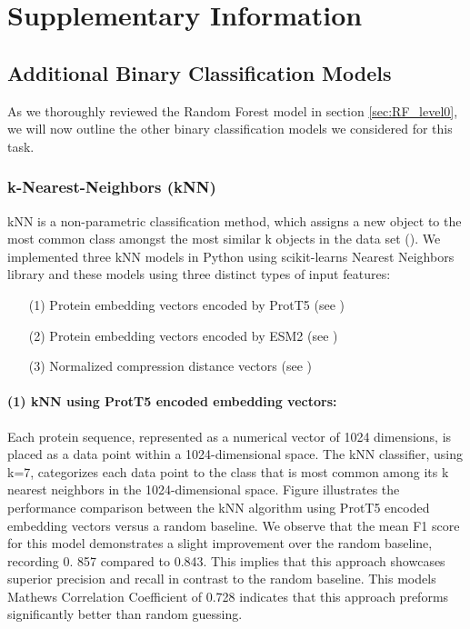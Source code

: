\documentclass{bioinfo}
\begin{document}
\section{Supplementary Information}

\subsection{Additional Binary Classification Models}\label{sec:unused binarys}
As we thoroughly reviewed the Random Forest model in section \ref{sec:RF_level0}, we will now outline the other binary classification models we considered for this task.

\subsubsection{k-Nearest-Neighbors (kNN)}
kNN is a non-parametric classification method,
which assigns a new object to the most common class amongst the most similar k objects in the data set (\cite{knn_principles}). We implemented three kNN models in Python using scikit-learns Nearest Neighbors library and 
these models using three distinct types of input features:
\begin{enumerate}
	\item[(1)] Protein embedding vectors encoded by ProtT5 (see \cite{ProtT5})
    \item[(2)] Protein embedding vectors encoded by ESM2 (see \cite{ESM2})
    \item[(3)] Normalized compression distance vectors (see \cite{GzipTextClassification})
\end{enumerate}


\paragraph{(1) kNN using ProtT5 encoded embedding vectors:}

Each protein sequence, represented as a numerical vector of 1024 dimensions, is placed as a data 
point within a 1024-dimensional space. The kNN classifier, using k=7,
categorizes each data point to the class that is most common among its k nearest neighbors in the 1024-dimensional space.
Figure 
illustrates the performance comparison between the kNN algorithm using ProtT5 encoded embedding vectors versus a random baseline. 
We observe that the mean F1 score for this model demonstrates a slight improvement over the random baseline,
recording 0. 857 compared to 0.843. This implies that this approach showcases superior precision and recall in contrast to the random baseline.
This models Mathews Correlation Coefficient of 0.728 indicates that this approach preforms significantly better than random guessing.
\end{document}
